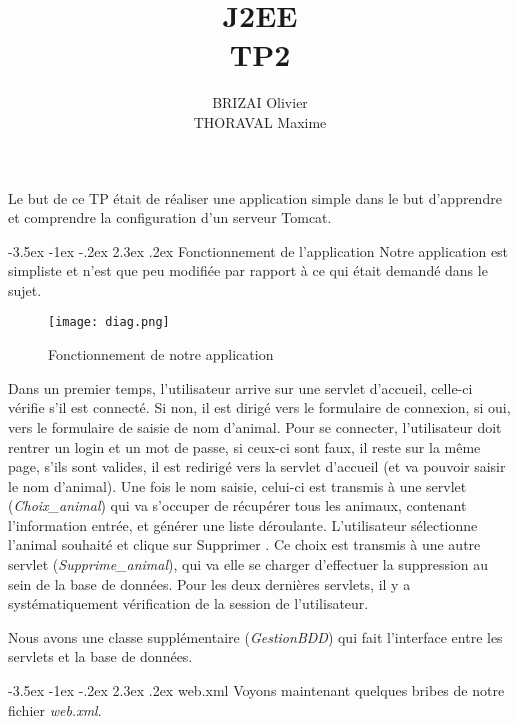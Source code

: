 \documentclass[a4paper,12pt]{article}
\makeatletter
\renewcommand\section{\@startsection {section}{1}{\z@}%
                           {-3.5ex \@plus -1ex \@minus -.2ex}%
                           {2.3ex \@plus.2ex}%
                           {\normalfont\Large\bfseries}}
\makeatother
\begin{document}
\newpage
\title{J2EE\\TP2}
\date{}
\author{BRIZAI Olivier\\THORAVAL Maxime}
\maketitle

\newpage
Le but de ce TP était de réaliser une application simple dans le but d'apprendre et comprendre la configuration d'un serveur Tomcat.

\section{Fonctionnement de l'application}
Notre application est simpliste et n'est que peu modifiée par rapport à ce qui était demandé dans le sujet.

\begin{figure}[H]
	\center
	\texttt{[image: diag.png]}
	\caption{Fonctionnement de notre application}
\end{figure}

Dans un premier temps, l'utilisateur arrive sur une servlet d'accueil, celle-ci vérifie s'il est connecté. Si non, il est dirigé vers le formulaire de connexion, si oui, vers le formulaire de saisie de nom d'animal. Pour se connecter, l'utilisateur doit rentrer un login et un mot de passe, si ceux-ci sont faux, il reste sur la même page, s'ils sont valides, il est redirigé vers la servlet d'accueil (et va pouvoir saisir le nom d'animal). Une fois le nom saisie, celui-ci est transmis à une servlet (\textit{Choix\_animal}) qui va s'occuper de récupérer tous les animaux, contenant l'information entrée, et générer une liste déroulante. L'utilisateur sélectionne l'animal souhaité et clique sur \og Supprimer \fg. Ce choix est transmis à une autre servlet (\textit{Supprime\_animal}), qui va elle se charger d'effectuer la suppression au sein de la base de données. Pour les deux dernières servlets, il y a systématiquement vérification de la session de l'utilisateur.

Nous avons une classe supplémentaire (\textit{GestionBDD}) qui fait l'interface entre les servlets et la base de données.

\section{web.xml}
Voyons maintenant quelques bribes de notre fichier \textit{web.xml}.
\end{document}
